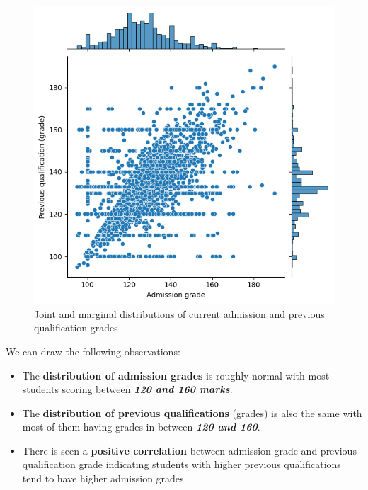 \documentclass[
  letterpaper,
  DIV=11,
  numbers=noendperiod]{scrartcl}
\begin{document}
\begin{figure}

{\centering \includegraphics{report_AzadhdhinNedalYunisAlFraijat_files/figure-pdf/fig-points-distr-output-1.png}

}

\caption{\label{fig-points-distr}Joint and marginal distributions of
current admission and previous qualification grades}

\end{figure}

We can draw the following observations:

\begin{itemize}
\item
  The \textbf{distribution of admission grades} is roughly normal with
  most students scoring between \textbf{\emph{120 and 160 marks}}.
\item
  The \textbf{distribution of previous qualifications} (grades) is also
  the same with most of them having grades in between \textbf{\emph{120
  and 160}}.
\item
  There is seen a \textbf{positive correlation} between admission grade
  and previous qualification grade indicating students with higher
  previous qualifications tend to have higher admission grades.
\end{itemize}
\end{document}
